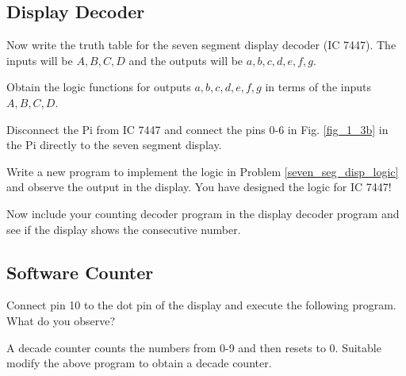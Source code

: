 \subsection{Display Decoder}
%
\begin{problem}
Now write the truth table for the seven segment display decoder (IC 7447).  The inputs will be $A,B,C,D$ and the outputs will be $a,b,c,d,e,f,g$.
\end{problem}
%
\begin{problem}
\label{seven_seg_disp_logic}
Obtain the logic functions for outputs $a,b,c,d,e,f,g$ in terms of the inputs $A,B,C,D$.
\end{problem}
\begin{problem}
Disconnect the Pi from IC 7447 and connect the pins 0-6 in Fig. \ref{fig_1_3b} in the Pi directly to the seven segment display.
\end{problem}
\begin{problem}
Write a new program to implement the logic in Problem \ref{seven_seg_disp_logic} and observe the output in the display.  You have designed the logic for IC 7447!
\end{problem}
\begin{problem}
Now include your counting decoder program in the  display decoder program
and see if the display shows the consecutive number.
\end{problem}
\subsection{Software Counter}
%
\begin{problem}
Connect pin 10 to the dot pin of the display and execute the following program.  What do you observe?
\end{problem}
%

%
\begin{problem}
A decade counter counts the numbers from 0-9 and then resets to 0.  Suitable modify the above program to obtain a decade counter.
\end{problem}



